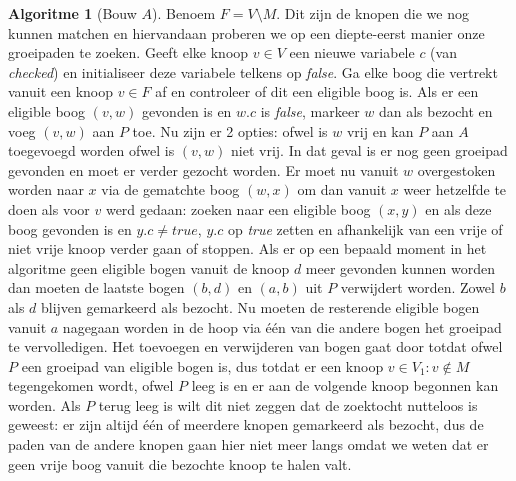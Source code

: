 \documentclass[conference]{IEEEtran}
\theoremstyle{definition}
\newtheorem{algorithmm}{Algoritme}[section]
\theoremstyle{remark}
\begin{document}
\begin{algorithmm}[Bouw $A$] \label{alg:match:match:1}
    Benoem $F = V \setminus M$. Dit zijn de knopen die we nog kunnen matchen en hiervandaan proberen we op een diepte-eerst manier onze groeipaden te zoeken. Geeft elke knoop $v \in V$ een nieuwe variabele $c$ (van \textit{checked}) en initialiseer deze variabele telkens op \textit{false}. Ga elke boog die vertrekt vanuit een knoop $v \in F$ af en controleer of dit een eligible boog is. Als er een eligible boog $(v, w)$ gevonden is en $w.c$ is \textit{false}, markeer $w$ dan als bezocht en voeg $(v, w)$ aan $P$ toe. Nu zijn er 2 opties: ofwel is $w$ vrij en kan $P$ aan $A$ toegevoegd worden ofwel is $(v, w)$ niet vrij. In dat geval is er nog geen groeipad gevonden en moet er verder gezocht worden. Er moet nu vanuit $w$ overgestoken worden naar $x$ via de gematchte boog $(w, x)$ om dan vanuit $x$ weer hetzelfde te doen als voor $v$ werd gedaan: zoeken naar een eligible boog $(x, y)$ en als deze boog gevonden is en $y.c \neq true$, $y.c$ op \textit{true} zetten en afhankelijk van een vrije of niet vrije knoop verder gaan of stoppen. Als er op een bepaald moment in het algoritme geen eligible bogen vanuit de knoop $d$ meer gevonden kunnen worden dan moeten de laatste bogen $(b, d)$ en $(a, b)$ uit $P$ verwijdert worden. Zowel $b$ als $d$ blijven gemarkeerd als bezocht. Nu moeten de resterende eligible bogen vanuit $a$ nagegaan worden in de hoop via één van die andere bogen het groeipad te vervolledigen. Het toevoegen en verwijderen van bogen gaat door totdat ofwel $P$ een groeipad van eligible bogen is, dus totdat er een knoop $v \in V_1: v \notin M$ tegengekomen wordt, ofwel $P$ leeg is en er aan de volgende knoop begonnen kan worden. Als $P$ terug leeg is wilt dit niet zeggen dat de zoektocht nutteloos is geweest: er zijn altijd één of meerdere knopen gemarkeerd als bezocht, dus de paden van de andere knopen gaan hier niet meer langs omdat we weten dat er geen vrije boog vanuit die bezochte knoop te halen valt.
\end{algorithmm}

\end{document}
